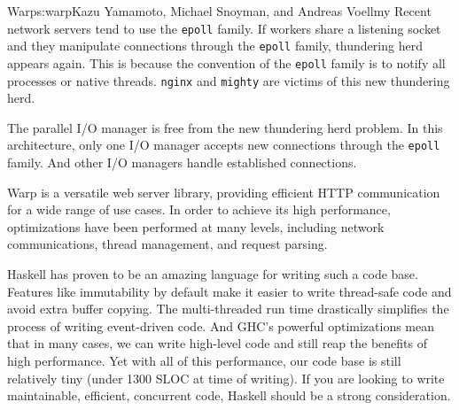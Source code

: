 \begin{aosachapter}{Warp}{s:warp}{Kazu Yamamoto, Michael Snoyman, and Andreas Voellmy}
Recent network servers tend to use the \texttt{epoll} family. If workers
share a listening socket and they manipulate connections through the
\texttt{epoll} family, thundering herd appears again. This is because
the convention of the \texttt{epoll} family is to notify all processes
or native threads. \texttt{nginx} and \texttt{mighty} are victims of
this new thundering herd.

The parallel I/O manager is free from the new thundering herd problem.
In this architecture, only one I/O manager accepts new connections
through the \texttt{epoll} family. And other I/O managers handle
established connections.


Warp is a versatile web server library, providing efficient HTTP
communication for a wide range of use cases. In order to achieve its
high performance, optimizations have been performed at many levels,
including network communications, thread management, and request
parsing.

Haskell has proven to be an amazing language for writing such a code
base. Features like immutability by default make it easier to write
thread-safe code and avoid extra buffer copying. The multi-threaded run
time drastically simplifies the process of writing event-driven code.
And GHC's powerful optimizations mean that in many cases, we can write
high-level code and still reap the benefits of high performance. Yet
with all of this performance, our code base is still relatively tiny
(under 1300 SLOC at time of writing). If you are looking to write
maintainable, efficient, concurrent code, Haskell should be a strong
consideration.

\end{aosachapter}

